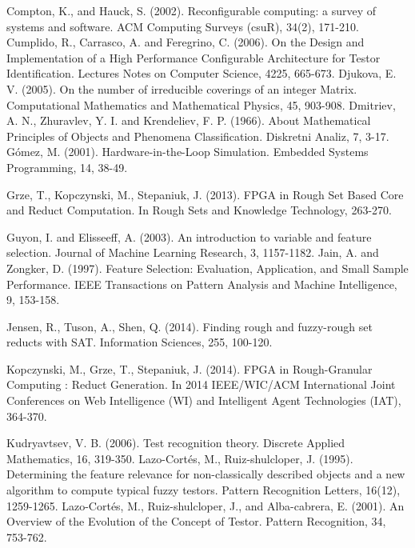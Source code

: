 \documentclass[authoryear,preprint,review,12pt]{elsarticle}
\begin{document}
\begin{thebibliography}{00}

Compton, K., and Hauck, S. (2002). Reconfigurable computing: a survey of systems and software. ACM Computing Surveys (csuR), 34(2), 171-210.
 Cumplido, R., Carrasco, A. and Feregrino, C. (2006). On the Design and Implementation of a High Performance Configurable Architecture for Testor Identification. Lectures Notes on Computer Science, 4225, 665-673.
Djukova, E. V. (2005). On the number of irreducible coverings of an integer Matrix. Computational Mathematics and Mathematical Physics, 45, 903-908.
 Dmitriev, A. N.,  Zhuravlev, Y. I. and Krendeliev, F. P. (1966). About Mathematical Principles of Objects and Phenomena Classification. Diskretni Analiz, 7, 3-17.
G\'omez, M. (2001). Hardware-in-the-Loop Simulation. Embedded Systems Programming, 14, 38-49.

Grze, T., Kopczynski, M., Stepaniuk, J. (2013). FPGA in Rough Set Based Core and Reduct Computation. In Rough Sets and Knowledge Technology, 263-270.

Guyon, I. and Elisseeff, A. (2003). An introduction to variable and feature selection. Journal of Machine Learning Research, 3, 1157-1182.
Jain, A. and Zongker, D. (1997). Feature Selection: Evaluation, Application, and Small Sample Performance. IEEE Transactions on Pattern Analysis and Machine Intelligence, 9, 153-158.

Jensen, R., Tuson, A., Shen, Q. (2014). Finding rough and fuzzy-rough set reducts with SAT. Information Sciences, 255, 100-120.

Kopczynski, M., Grze, T., Stepaniuk, J. (2014). FPGA in Rough-Granular Computing : Reduct Generation. In 2014 IEEE/WIC/ACM International Joint Conferences on Web Intelligence (WI) and Intelligent Agent Technologies (IAT), 364-370. 

Kudryavtsev, V. B. (2006). Test recognition theory. Discrete Applied Mathematics, 16, 319-350.
Lazo-Cort\'es, M., Ruiz-shulcloper, J. (1995). Determining the feature relevance for non-classically described objects and a new algorithm to compute typical fuzzy testors. Pattern Recognition Letters, 16(12), 1259-1265.
Lazo-Cort\'es, M., Ruiz-shulcloper, J., and Alba-cabrera, E. (2001). An Overview of the Evolution of the Concept of Testor. Pattern Recognition, 34, 753-762.


\end{thebibliography}
\end{document}

